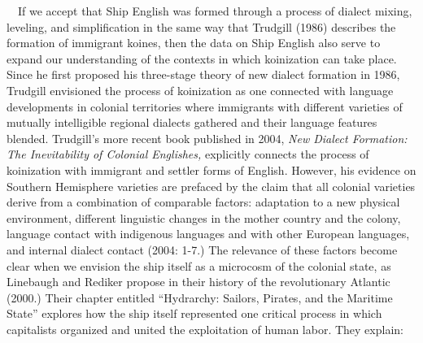 \begin{styleStandard}
\ \ If we accept that Ship English was formed through a process of dialect mixing, leveling, and simplification in the same way that Trudgill (1986) describes the formation of immigrant koines, then the data on Ship English also serve to expand our understanding of the contexts in which koinization can take place. Since he first proposed his three-stage theory of new dialect formation in 1986, Trudgill envisioned the process of koinization as one connected with language developments in colonial territories where immigrants with different varieties of mutually intelligible regional dialects gathered and their language features blended. Trudgill’s more recent book published in 2004, \textit{New Dialect Formation: The Inevitability of Colonial Englishes,} explicitly connects the process of koinization with immigrant and settler forms of English. However, his evidence on Southern Hemisphere varieties are prefaced by the claim that all colonial varieties derive from a combination of comparable factors: adaptation to a new physical environment, different linguistic changes in the mother country and the colony, language contact with indigenous languages and with other European languages, and internal dialect contact (2004: 1-7.) The relevance of these factors become clear when we envision the ship itself as a microcosm of the colonial state, as Linebaugh and Rediker propose in their history of the revolutionary Atlantic (2000.) Their chapter entitled “Hydrarchy: Sailors, Pirates, and the Maritime State” explores how the ship itself represented one critical process in which capitalists organized and united the exploitation of human labor. They explain:
\end{styleStandard}


